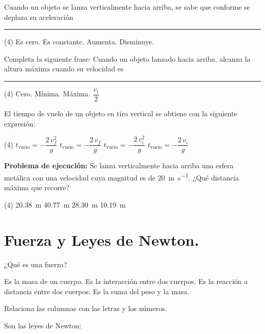 \documentclass[12pt, letter]{exam}
\begin{document}
\begin{questions}
    \question Cuando un objeto se lanza verticalmente hacia arriba, se sabe que conforme se deplaza su aceleración \rule{2cm}{0.3mm}
    \begin{tasks}(4)
        \task Es cero.
        \task Es constante.
        \task Aumenta.
        \task Disminuye.
    \end{tasks}
    \question Completa la siguiente frase: Cuando un objeto lanzado hacia arriba, alcanza la altura máxima cuando su velocidad es \rule{2cm}{0.3mm}
    \begin{tasks}(4)
        \task Cero.
        \task Mínima.
        \task Máxima.
        \task $\dfrac{v_{i}}{2}$
    \end{tasks}
    \question El tiempo de vuelo de un objeto en tiro vertical se obtiene con la siguiente expresión:
    \begin{tasks}(4)
        \task $t_{\text{vuelo}} = - \dfrac{2 \, v_{f}^{2}}{g}$
        \task $t_{\text{vuelo}} = - \dfrac{2 \, v_{f}}{g}$
        \task $t_{\text{vuelo}} = - \dfrac{2 \, v_{i}^{2}}{g}$
        \task $t_{\text{vuelo}} = - \dfrac{2 \, v_{i}}{g}$
    \end{tasks}
    \question \label{Problema_03} \textbf{Problema de ejecución: }Se lanza verticalmente hacia arriba una esfera metálica con una velocidad cuya magnitud es de \SI{20}{\meter\per\second}. ¿Qué distancia máxima que recorre?
    \begin{tasks}(4)
        \task \SI{20.38}{\meter}
        \task \SI{40.77}{\meter}
        \task \SI{28.30}{\meter}
        \task \SI{10.19}{\meter}
    \end{tasks}
    
    \section{Fuerza y Leyes de Newton.}

    \question ¿Qué es una fuerza?
    \begin{tasks}
        \task Es la masa de un cuerpo.
        \task Es la interacción entre dos cuerpos.
        \task Es la reacción a distancia entre dos cuerpos.
        \task Es la suma del peso y la masa.
    \end{tasks}
    \question Relaciona las columnas con las letras y los números.
    
    Son las leyes de Newton:
    
    \begin{minipage}[t]{0.4\linewidth}
\end{minipage}
\end{questions}
\end{document}
